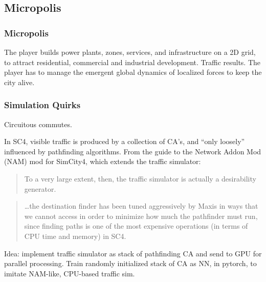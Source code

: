 \documentclass[xcolor=dvipsnames]{beamer}
\begin{document}
\subsection{Micropolis}
\begin{frame}
	\frametitle{Micropolis}
	The player builds  power plants, zones, services, and infrastructure on a 2D grid, to attract residential, commercial and industrial development. Traffic results. The player has to manage the emergent global dynamics of localized forces to keep the city alive.

\begin{center}
\end{center}
	

\end{frame}
\begin{frame}
	\frametitle{Simulation Quirks}
\end{frame}
\begin{frame}
	Circuitous commutes.
	\begin{outline}
			\1 In SC4, visible traffic is produced by a collection of CA's, and ``only loosely'' influenced by pathfinding algorithms. From the guide to the Network Addon Mod (NAM) mod for SimCity4, which extends the traffic simulator:
			\end{outline}
				\begin{quote}
					To a very large extent, then, the traffic simulator is actually a desirability generator.
				\end{quote}
				\begin{quote}
					\dots the destination finder has been tuned aggressively by Maxis in ways that we cannot access in order to minimize how much the pathfinder must run, since finding paths is one of the most expensive operations (in terms of CPU time and memory) in SC4.
\end{quote}
\begin{outline}
\1 Idea: implement traffic simulator as stack of pathfinding CA and send to GPU for parallel processing.
\2 Train randomly initialized stack of CA as NN, in pytorch, to imitate NAM-like, CPU-based traffic sim.
\end{outline}

\end{frame}
\end{document}
